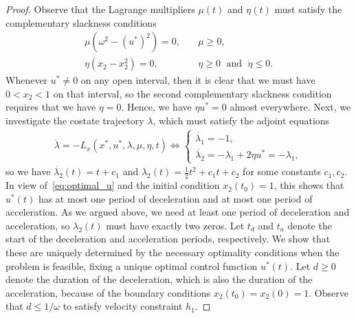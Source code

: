 \documentclass[a4paper]{article}
\theoremstyle{definition}
\theoremstyle{plain}
\begin{document}
\begin{proof}
Observe that the Lagrange multipliers $\mu(t)$ and $\eta(t)$ must satisfy the
complementary slackness conditions
\begin{align*}
  \mu (\omega^{2} - {(u^{*})}^{2}) = 0 ,& \quad \mu \geq 0 , \\
  \eta (x_{2} - x_{2}^{2}) = 0 ,& \quad \eta \geq 0 \; \text{ and } \; \dot{\eta} \leq 0 .
\end{align*}
%
Whenever $u^{*} \neq 0$ on any open interval, then it is clear that we must have
$0 < x_{2} < 1$ on that interval, so the second complementary slackness
condition requires that we have $\eta = 0$. Hence, we have $\eta u^{*} = 0$
almost everywhere.
%
Next, we investigate the costate trajectory $\lambda$, which must satisfy the adjoint
equations
\begin{align*}
  \dot{\lambda} = - L_{x}(x^{*}, u^{*}, \lambda, \mu, \eta, t) \iff
  \begin{cases}
    \dot{\lambda_{1}} = -1 , \\
    \dot{\lambda_{2}} = - \lambda_{1} + 2 \eta u^{*} = -\lambda_{1} ,
  \end{cases}
\end{align*}
%
so we have $\dot{\lambda_{2}}(t) = t + c_{1}$ and
$\lambda_{2}(t) = \frac{1}{2}t^{2} + c_{1}t + c_{2}$ for some constants
$c_{1}, c_{2}$.
%
In view of~\eqref{eq:optimal_u} and the initial condition $x_{2}(t_{0}) = 1$, this shows that
$u^{*}(t)$ has at most one period of deceleration and at most one period of
acceleration.
%
As we argued above, we need at least one period of deceleration and
acceleration, so $\lambda_{2}(t)$ must have exactly two zeros. Let $t_{d}$ and $t_{a}$
denote the start of the deceleration and acceleration periods, respectively.
%
We show that these are uniquely determined by the necessary optimality
conditions when the problem is feasible, fixing a unique optimal control
function $u^{*}(t)$.
%
Let $d \geq 0$ denote the duration of the deceleration, which is also the duration
of the acceleration, because of the boundary conditions
$x_{2}(t_{0}) = x_{2}(0) = 1$. Observe that $d \leq 1 / \omega$ to satisfy velocity
constraint $h_{1}$.


\end{proof}
\end{document}

